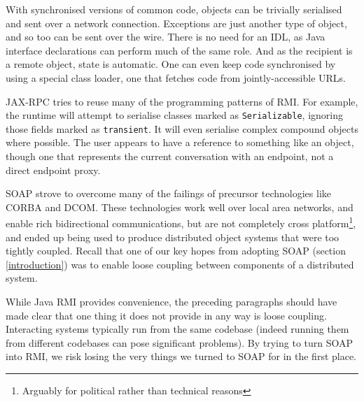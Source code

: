 With synchronised versions of common code, objects can be trivially
serialised and sent over a network connection. Exceptions are just
another type of object, and so too can be sent over the wire. There is
no need for an IDL, as Java interface declarations can perform much of
the same role. And as the recipient is a remote object, state is
automatic.  One can even keep code synchronised by using a special
class loader, one that fetches code from jointly-accessible URLs.

JAX-RPC tries to reuse many of the programming patterns of RMI. For
example, the runtime will attempt to serialise classes marked as
{\tt Serializable}, ignoring those fields marked as
{\tt transient}. It will even serialise complex compound objects where
possible. The user appears to have a reference to something like an
object, though one that represents the current conversation with an
endpoint, not a direct endpoint proxy.


SOAP strove to overcome many of the failings of precursor technologies
like CORBA and DCOM. These technologies work well over local area
networks, and enable rich bidirectional communications, but are not
completely cross platform\footnote{Arguably for political rather than
technical reasons}, and ended up being used to produce distributed
object systems that were too tightly coupled. Recall that one of our
key hopes from adopting SOAP (section \ref{introduction}) was to
enable loose coupling between components of a distributed system.

While Java RMI provides convenience, the preceding paragraphs
should have made clear that one thing it does not provide in any way
is loose coupling. Interacting systems typically run from the same
codebase (indeed running them from different codebases can pose
significant problems). By trying to turn SOAP into RMI, we risk losing
the very things we turned to SOAP for in the first place.





